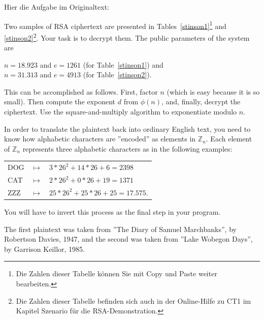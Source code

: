 \begin{refsegment}
 Hier die Aufgabe im Originaltext:

Two samples of RSA ciphertext are presented in Tables~\ref{stinson1}\footnote{%
Die Zahlen dieser Tabelle können Sie mit Copy und Paste weiter bearbeiten.
}
and \ref{stinson2}\footnote{%
  Die Zahlen dieser Tabelle befinden sich auch in der Online-Hilfe zu
  CT1 im Kapitel \glqq Szenario für die RSA-Demonstration\grqq.
}.
Your task is to decrypt them. The public parameters of the system are

 $n = 18.923$ and $e = 1261$ (for Table~\ref{stinson1}) and\\
 $n = 31.313$ and $e = 4913$ (for Table~\ref{stinson2}).

This can be accomplished as follows. First, factor $n$ (which is easy
because it is so small). Then compute the exponent $d$ from $\phi(n)$, and,
finally, decrypt the ciphertext. Use the square-and-multiply
 algorithm to exponentiate modulo $n$.

In order to translate the plaintext back into ordinary English text, you
need to know how alphabetic characters are ''encoded'' as elements in
$\mathbb{Z}_n$. Each element of $\mathbb{Z}_n$ represents three alphabetic
characters as in the following examples:

{\tt \begin{tabular}{lll}
DOG & $\mapsto$ & $3 * 26^2 + 14 * 26 + 6= 2398$\\
CAT & $\mapsto$ & $2 * 26^2 + 0 * 26 + 19 = 1371$\\
ZZZ & $\mapsto$ & $25 * 26^2 + 25 * 26 + 25 = 17.575$.
\end{tabular} }

You will have to invert this process as the final step in your program.

The first plaintext was taken from ''The Diary of Samuel Marchbanks'', by
Robertson Davies, 1947, and the second was taken from ''Lake Wobegon Days'',
by Garrison Keillor, 1985.


\end{refsegment}
